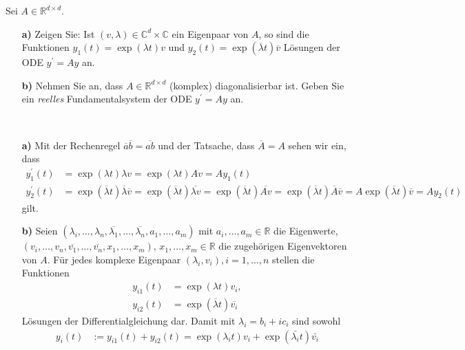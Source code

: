 \begin{exercise}
Sei $A \in \mathbb{R}^{d\times d}$.
\begin{itemize}
  \item [\textbf{a)}]Zeigen Sie: Ist $(v,\lambda) \in \mathbb{C}^d
  \times \mathbb{C}$ ein Eigenpaar von $A$, so sind die Funktionen
  $y_1(t) = \exp(\lambda t)v$ und $y_2(t) = \exp(\overline{\lambda}t)\overline{v}$
  Lösungen der ODE $y^{\prime} = Ay$ an.
  \item [\textbf{b)}] Nehmen Sie an, dass $A \in \mathbb{R}^
  {d \times d}$ (komplex) diagonalisierbar ist. Geben Sie ein
  \textit{reelles} Fundamentalsystem der ODE $y^{\prime} = Ay$ an.
\end{itemize}
\end{exercise}
\begin{solution}
\leavevmode \\
\begin{itemize}
  \item [\textbf{a)}]
  Mit der Rechenregel $\overline{a}\overline{b} = \overline{ab}$ und der Tatsache, dass $\overline{A} = A$
  sehen wir ein, dass
  \begin{align*}
    y_1^{\prime}(t) &= \exp(\lambda t)\lambda v = \exp(\lambda t)A v = Ay_1(t) \\
    y_2^{\prime}(t) &= \exp(\overline{\lambda}t)\overline{\lambda}\overline{v} = \exp(\overline{\lambda}t) \overline{\lambda v} =
    \exp(\overline{\lambda}t) \overline{Av} =  \exp(\overline{\lambda}t) \overline{A}\overline{v} = A\exp(\overline{\lambda}t)\overline{v} = Ay_2(t)
  \end{align*}
  gilt.
  \item [\textbf{b)}]
  Seien $(\lambda_i,\dots,\lambda_n,\overline{\lambda_1},\dots,\overline{\lambda_n},a_1,\dots,a_m)$
  mit $a_i,\dots,a_m \in \mathbb{R}$ die Eigenwerte, \\
  $(v_i,\dots,v_n,\overline{v_1},\dots,\overline{v_n},x_1,\dots,x_m)$, $x_1,\dots,x_m \in \mathbb{R}$
  die zugehörigen Eigenvektoren von $A$.
  Für jedes komplexe Eigenpaar $(\lambda_i, v_i), i = 1,\dots,n$ stellen die Funktionen
  \begin{align*}
    y_{i1}(t) &= \exp(\lambda t)v_i, \\
    y_{i2}(t) &= \exp(\overline{\lambda} t)\overline{v_i}
  \end{align*}
  Lösungen der Differentialgleichung dar. Damit mit $\lambda_i = b_i + ic_i$ sind sowohl
  \begin{align*}
    y_i(t) &:= y_{i1}(t) + y_{i2}(t) = \exp(\lambda_i t)v_i + \exp(\bar{\lambda_i} t)\bar{v_i}

\end{align*}
\end{itemize}
\end{solution}
